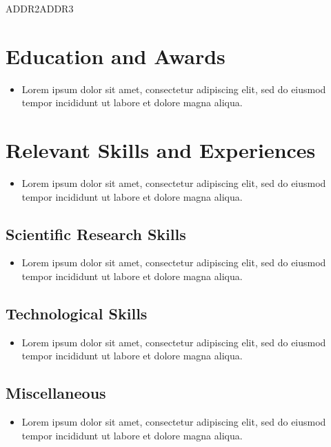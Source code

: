 \documentclass{simplylongcv}
\begin{document}
\begin{center}

\address{ADDR1}{ADDR2}{ADDR3}
\end{center}

\section{Education and Awards}
		\begin{itemize}
			\item Lorem ipsum dolor sit amet, consectetur adipiscing elit, sed do eiusmod tempor incididunt ut labore et dolore magna aliqua.
		\end{itemize}

\section{Relevant Skills and Experiences}
		\begin{itemize}
			\item Lorem ipsum dolor sit amet, consectetur adipiscing elit, sed do eiusmod tempor incididunt ut labore et dolore magna aliqua.
		\end{itemize}

	\subsection{Scientific Research Skills}
		\begin{itemize}
			\item Lorem ipsum dolor sit amet, consectetur adipiscing elit, sed do eiusmod tempor incididunt ut labore et dolore magna aliqua.
		\end{itemize}
		
	\subsection{Technological Skills}
		\begin{itemize}
			\item Lorem ipsum dolor sit amet, consectetur adipiscing elit, sed do eiusmod tempor incididunt ut labore et dolore magna aliqua.
		\end{itemize}
		
	\subsection{Miscellaneous}
		\begin{itemize}
			\item Lorem ipsum dolor sit amet, consectetur adipiscing elit, sed do eiusmod tempor incididunt ut labore et dolore magna aliqua.
		\end{itemize}
\end{document}
